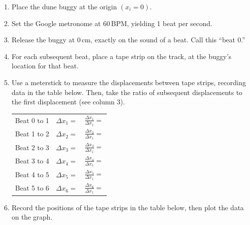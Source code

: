 \documentclass[]{exam}
\begin{document}
\begin{enumerate}[itemsep=0pt,topsep=2pt]
\item Place the dune buggy at the origin $\left(x_i = 0\right)$.
\item Set the Google metronome at 60\,BPM, yielding 1 beat per second.
\item Release the buggy at 0\,cm, exactly on the sound of a beat. Call this ``beat 0.''
\item For each subsequent beat, place a tape strip on the track, at the buggy’s location for that beat.
\item Use a meterstick to measure the displacements between tape strips, recording data in the table below. Then, take the ratio of subsequent displacements to the first displacement (see column 3).

\begin{center}
\def\arraystretch{2}
\begin{tabular}{|w{c}{3cm}|w{l}{5cm}|w{l}{2.5cm}|}
    \hline
     &  &  \\ \hline
    Beat 0 to 1 & $\Delta x_1 =$  & $\displaystyle \frac{\Delta x_1}{\Delta x_1} = $ \\[1ex] \hline 
    Beat 1 to 2 & $\Delta x_2 =$  & $\displaystyle \frac{\Delta x_2}{\Delta x_1} = $ \\[1ex] \hline 
    Beat 2 to 3 & $\Delta x_3 =$  & $\displaystyle \frac{\Delta x_3}{\Delta x_1} = $ \\[1ex] \hline 
    Beat 3 to 4 & $\Delta x_4 =$  & $\displaystyle \frac{\Delta x_4}{\Delta x_1} = $ \\[1ex] \hline 
    Beat 4 to 5 & $\Delta x_5 =$  & $\displaystyle \frac{\Delta x_5}{\Delta x_1} = $ \\[1ex] \hline 
    Beat 5 to 6 & $\Delta x_6 =$  & $\displaystyle \frac{\Delta x_6}{\Delta x_1} = $ \\[1ex] \hline 
\end{tabular}
\end{center}

\item Record the positions of the tape strips in the table below, then plot the data on the graph.


\end{enumerate}
\end{document}
